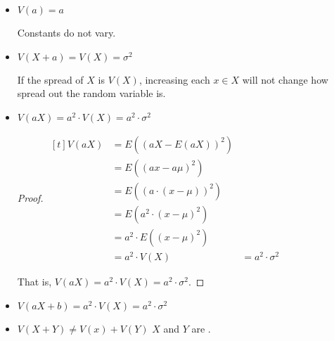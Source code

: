 \begin{itemize}
    \item $V(a) = a$

    Constants do not vary. 

    \item $V(X + a) = V(X) = \sigma^2$

    If the spread of $X$ is $V(X)$, increasing each $x \in X$ will not change how spread out the random variable is. 

    \item $V(aX) = a^2 \cdot V(X) = a^2 \cdot \sigma^2$
    
    \begin{proof}
        $\begin{aligned}[t]
            V(aX) & = E \left( (aX - E(aX))^2 \right)        \\
                  & = E \left( (ax - a\mu)^2 \right)         \\
                  & = E \left( (a \cdot (x - \mu))^2 \right) \\
                  & = E \left( a^2 \cdot (x - \mu)^2 \right) \\
                  & = a^2 \cdot E \left( (x - \mu)^2 \right) \\
                  & = a^2 \cdot V(X)
                  & = a^2 \cdot \sigma^2
        \end{aligned}$
        
        That is, $V(aX) = a^2 \cdot V(X) = a^2 \cdot \sigma^2$. 
    \end{proof}

    \item $V(aX + b) = a^2 \cdot V(X) = a^2 \cdot \sigma^2$

    \item $V(X + Y) \neq V(x) + V(Y)$  $X$ and $Y$ are . 
\end{itemize}

